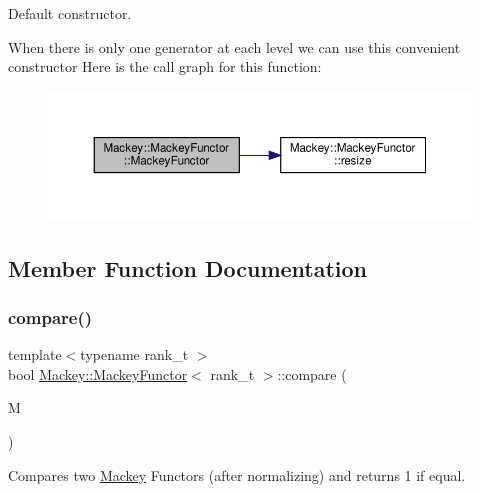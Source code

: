 Default constructor. 

When there is only one generator at each level we can use this convenient constructor Here is the call graph for this function\+:\nopagebreak
\begin{figure}[H]
\begin{center}
\leavevmode
\includegraphics[width=350pt]{classMackey_1_1MackeyFunctor_a7cdc1be794a7b39e7d4b86c2ad26355e_cgraph}
\end{center}
\end{figure}


\subsection{Member Function Documentation}
\mbox{\label{classMackey_1_1MackeyFunctor_a334a91a445ac86cc5cce53b29efd6df1}} 
\subsubsection{\texorpdfstring{compare()}{compare()}}
{\footnotesize\ttfamily template$<$typename rank\+\_\+t $>$ \\
bool \hyperlink{classMackey_1_1MackeyFunctor}{Mackey\+::\+Mackey\+Functor}$<$ rank\+\_\+t $>$\+::compare (\begin{DoxyParamCaption}\item[{const \hyperlink{classMackey_1_1MackeyFunctor}{Mackey\+Functor}$<$ rank\+\_\+t $>$ \&}]{M }\end{DoxyParamCaption})\hspace{0.3cm}{\ttfamily [inline]}}



Compares two \hyperlink{namespaceMackey}{Mackey} Functors (after normalizing) and returns 1 if equal. 

